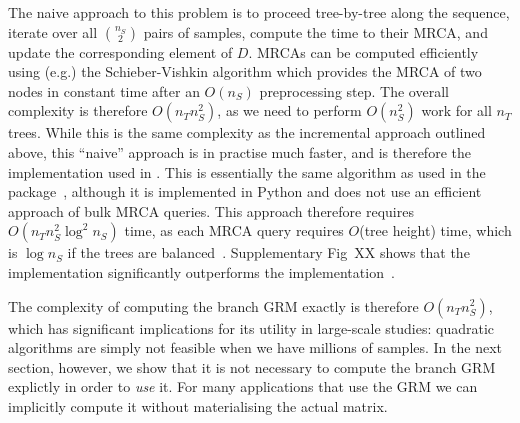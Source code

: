 The naive approach to this problem 
is to proceed tree-by-tree along the sequence,
iterate over all $\binom{n_S}{2}$ pairs of samples, compute the 
time to their MRCA, and update the corresponding element of $D$.
MRCAs can be computed efficiently using (e.g.) the Schieber-Vishkin
algorithm \citep{Schieber1988On,knuth2011combinatorial}
which provides the MRCA of two nodes in constant time
after an $O(n_S)$ preprocessing step.
The overall complexity is therefore $O(n_T n_S^2)$,
as we need to perform $O(n_S^2)$ work for all $n_T$ trees.
While this is the same complexity as the incremental approach outlined
above, this ``naive'' approach is in practise much faster, and 
is therefore the implementation used in \tskit{}.
This is essentially the same algorithm as used in the 
\eGRM{} package~\citet{fan2022genealogical}, although it is implemented in
Python and does not use an efficient approach of bulk MRCA queries. 
This approach therefore requires $O(n_T n_S^2 \log^2{n_S})$ time, 
as each MRCA query requires $O$(tree height) time, which is $\log n_S$
if the trees are balanced~\citep{kelleher2016efficient}.
Supplementary Fig~XX shows that the \tskit{} implementation 
significantly outperforms the \eGRM{}
implementation~\citep{fan2022genealogical}.

The complexity of computing the branch GRM exactly is therefore $O(n_T n_S^2)$,
which has significant implications for its utility in large-scale studies:
quadratic algorithms are simply not feasible when we have millions 
of samples. In the next section, however, we show that it is not necessary
to compute the branch GRM explictly in order to \emph{use} it. For many 
applications that use the GRM we can implicitly compute it without 
materialising the actual matrix.




